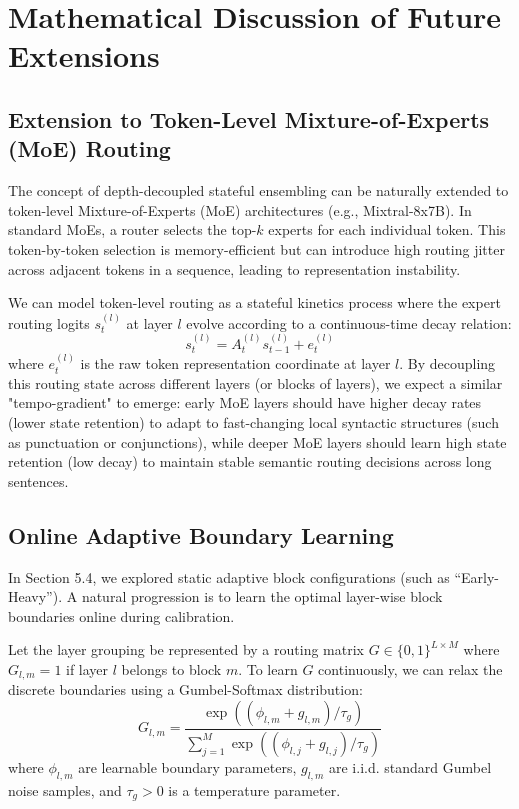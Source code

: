 \documentclass{article}
\theoremstyle{plain}
\theoremstyle{definition}
\theoremstyle{remark}
\begin{document}
\section{Mathematical Discussion of Future Extensions}
\label{app:future_extensions}

\subsection{Extension to Token-Level Mixture-of-Experts (MoE) Routing}
The concept of depth-decoupled stateful ensembling can be naturally extended to token-level Mixture-of-Experts (MoE) architectures (e.g., Mixtral-8x7B). In standard MoEs, a router selects the top-$k$ experts for each individual token. This token-by-token selection is memory-efficient but can introduce high routing jitter across adjacent tokens in a sequence, leading to representation instability.

We can model token-level routing as a stateful kinetics process where the expert routing logits $s^{(l)}_t$ at layer $l$ evolve according to a continuous-time decay relation:
\begin{equation}
    s^{(l)}_t = A^{(l)}_t s^{(l)}_{t-1} + e^{(l)}_t
\end{equation}
where $e^{(l)}_t$ is the raw token representation coordinate at layer $l$. By decoupling this routing state across different layers (or blocks of layers), we expect a similar "tempo-gradient" to emerge: early MoE layers should have higher decay rates (lower state retention) to adapt to fast-changing local syntactic structures (such as punctuation or conjunctions), while deeper MoE layers should learn high state retention (low decay) to maintain stable semantic routing decisions across long sentences.

\subsection{Online Adaptive Boundary Learning}
In Section 5.4, we explored static adaptive block configurations (such as ``Early-Heavy''). A natural progression is to learn the optimal layer-wise block boundaries online during calibration.

Let the layer grouping be represented by a routing matrix $G \in \{0, 1\}^{L \times M}$ where $G_{l, m} = 1$ if layer $l$ belongs to block $m$. To learn $G$ continuously, we can relax the discrete boundaries using a Gumbel-Softmax distribution:
\begin{equation}
    G_{l, m} = \frac{\exp\left( (\phi_{l, m} + g_{l, m}) / \tau_g \right)}{\sum_{j=1}^M \exp\left( (\phi_{l, j} + g_{l, j}) / \tau_g \right)}
\end{equation}
where $\phi_{l, m}$ are learnable boundary parameters, $g_{l, m}$ are i.i.d. standard Gumbel noise samples, and $\tau_g > 0$ is a temperature parameter.
\end{document}
